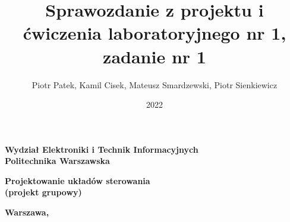 \documentclass[a4paper,titlepage,11pt,floatssmall]{mwrep}
\begin{document}
\frenchspacing
\pagestyle{uheadings}

\title{\bf Sprawozdanie z projektu i ćwiczenia laboratoryjnego nr 1, zadanie nr 1}
\author{Piotr Patek, Kamil Cisek, Mateusz Smardzewski, Piotr Sienkiewicz}
\date{2022}

\makeatletter
\renewcommand{\maketitle}{\begin{titlepage}
\begin{center}{\LARGE {\bf
Wydział Elektroniki i Technik Informacyjnych}}\\
\vspace{0.4cm}
{\LARGE {\bf Politechnika Warszawska}}\\
\vspace{0.3cm}
\end{center}
\vspace{5cm}
\begin{center}
{\bf \LARGE Projektowanie układów sterowania\\ (projekt grupowy) \vskip 0.1cm}
\end{center}
\vspace{1cm}
\begin{center}
{\bf \LARGE \@title \vskip 0.1cm}
\end{center}
\vspace{2cm}
\begin{center}
{\bf \Large \@author \par}
\end{center}
\vspace*{\stretch{6}}
\begin{center}
\bf{\large{Warszawa, \@date\vskip 0.1cm}}
\end{center}
\end{titlepage}
}
\makeatother

\maketitle

\tableofcontents


\end{document}
